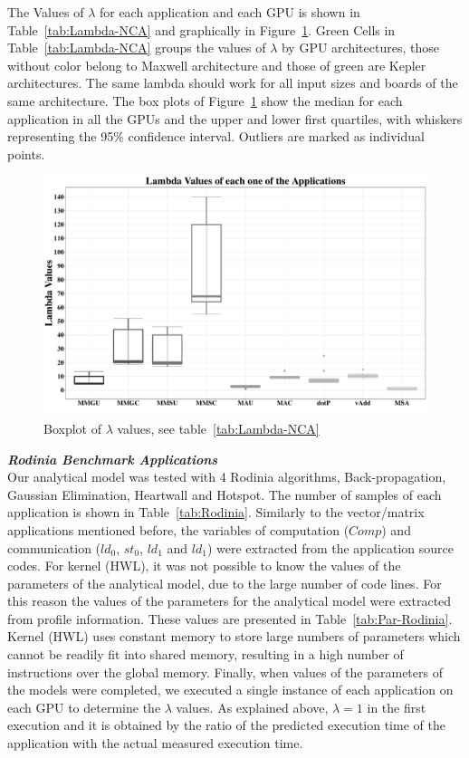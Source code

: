 The Values of $\lambda$ for each application and each GPU is shown in Table~\ref{tab:Lambda-NCA} and graphically in Figure~\ref{fig:LambdaNCA}. Green Cells in Table~\ref{tab:Lambda-NCA} groups the values of $\lambda$ by GPU architectures, those without color belong to Maxwell architecture and those of green are Kepler architectures. The same lambda should work for all input sizes and boards of the same architecture. The box plots of Figure~\ref{fig:LambdaNCA} show the median for each application in all the GPUs and the upper and lower first quartiles, with whiskers representing the 95\% confidence interval. Outliers are marked as individual points.

\begin{figure}[htpb]
\centering
 \includegraphics[scale=.3]{./images/LambdaAnalyticalModel-NCA.pdf}
\caption{Boxplot of $\lambda$ values, see table~\ref{tab:Lambda-NCA}}
\label{fig:LambdaNCA}
\end{figure}

\textbf{\emph{Rodinia Benchmark Applications}}\\
Our analytical model was tested with 4 Rodinia algorithms, Back-propagation, Gaussian Elimination, Heartwall and Hotspot. The number of samples of each application is shown in Table~\ref{tab:Rodinia}. Similarly to the vector/matrix applications mentioned before, the variables of computation ($Comp$) and communication ($ld_0$, $st_0$, $ld_1$ and $ld_1$) were extracted from the application source codes. For kernel (HWL), it was not possible to know the values of the parameters of the analytical model, due to the large number of code lines. For this reason the values of the parameters for the analytical model were extracted from profile information. These values are presented in Table~\ref{tab:Par-Rodinia}.  Kernel (HWL) uses constant memory to store large numbers of parameters which cannot be readily fit into shared memory, resulting in a high number of instructions over the global memory. Finally, when values of the parameters of the models were completed, we executed a single instance of each application on each GPU to determine the $\lambda$ values. As explained above, $\lambda=1$ in the first execution and it is obtained by the ratio of the predicted execution time of the application with the actual measured execution time. 

